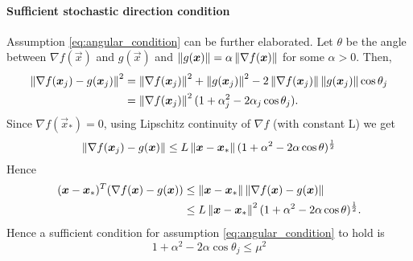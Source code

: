 \paragraph{Sufficient stochastic direction condition} Assumption \ref{eq:angular_condition} can be further elaborated.
Let $\theta$ be the angle between $\nabla f(\vec{x})$ and $g(\vec{x})$ and $\left\Vert g(\boldsymbol{x}) \right\Vert = \alpha \left\Vert \nabla f(\boldsymbol{x}) \right\Vert$ for some $\alpha>0$.
Then,
\begin{align}
\left\Vert \nabla f(\boldsymbol{x}_j)-g(\boldsymbol{x}_j) \right\Vert^2 &= \left\Vert \nabla f(\boldsymbol{x}_j) \right\Vert^2 + \left\Vert g(\boldsymbol{x}_j) \right\Vert^2 -2\left\Vert \nabla f(\boldsymbol{x}_j) \right\Vert\left\Vert g(\boldsymbol{x}_j) \right\Vert\cos\theta_j\\
&=  \left\Vert \nabla f(\boldsymbol{x}_j) \right\Vert^2(1+\alpha_j^2-2\alpha_j \cos\theta_j).
\end{align}
Since $\nabla f(\vec{x}_*)=0$, using Lipschitz continuity of $\nabla f$ (with constant L) we get
\begin{equation}
\left\Vert \nabla f(\boldsymbol{x}_j)-g(\boldsymbol{x}) \right\Vert \leq L\left\Vert \boldsymbol{x}-\boldsymbol{x}_* \right\Vert (1+\alpha^2-2\alpha \cos\theta)^{\frac{1}{2}}
\end{equation}
Hence
\begin{align}
(\boldsymbol{x}-\boldsymbol{x}_*)^T (\nabla f(\boldsymbol{x}) -g(\boldsymbol{x})) &\leq \left\Vert \boldsymbol{x}-\boldsymbol{x}_* \right\Vert \left\Vert \nabla f(\boldsymbol{x}) -g(\boldsymbol{x}) \right\Vert\\
&\leq L\left\Vert \boldsymbol{x}-\boldsymbol{x}_* \right\Vert^2 (1+\alpha^2-2\alpha \cos\theta)^{\frac{1}{2}}.
\end{align}
Hence a sufficient condition for assumption \ref{eq:angular_condition} to hold is
\begin{equation}
1+\alpha^2-2\alpha \cos\theta_j\leq \mu^2
\end{equation} 
